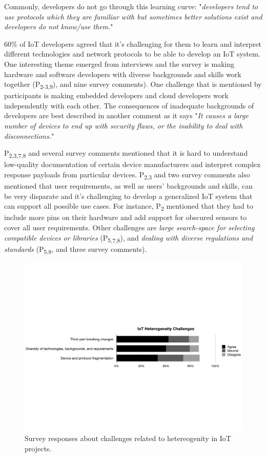 {Commonly, developers do not go through this learning curve: "\emph{developers tend to use protocols which they are familiar with but sometimes better solutions exist and developers do not know/use them.}" 

60\% of IoT developers agreed that it's challenging for them to learn and interpret different technologies and network protocols to be able to develop an IoT system.
One interesting theme emerged from interviews and the survey is making hardware and software developers with diverse backgrounds and skills work together (P\textsubscript{2-3,9}), and nine survey comments).
One challenge that is mentioned by participants is making embedded developers and cloud developers work independently with each other.
The consequences of inadequate backgrounds of developers are best described in another comment as it says "\emph{It causes a large number of devices to end up with security flaws, or the inability to deal with disconnections.}"

P\textsubscript{2,3,7,8} and several survey comments mentioned that it is hard to understand low-quality documentation of certain device manufacturers and interpret complex response payloads from particular devices. P\textsubscript{2,3} and two survey comments also mentioned that user requirements, as well as users' backgrounds and skills, can be very disparate and it's challenging to develop a generalized IoT system that can support all possible use cases. For instance, P\textsubscript{2} mentioned that they had to include more pins on their hardware and add support for obscured sensors to cover all user requirements. Other challenges are \emph{large search-space for selecting compatible devices or libraries} (P\textsubscript{5,7,8}), and \emph{dealing with diverse regulations and standards} (P\textsubscript{5,8}, and three survey comments).


 \begin{figure}%
  \centering
   \includegraphics[width=\linewidth]{imgs/survey2}
  \caption{Survey responses about challenges related to hetereogenity in IoT projects.}
  \label{fig:survey2}
\end{figure}

}

